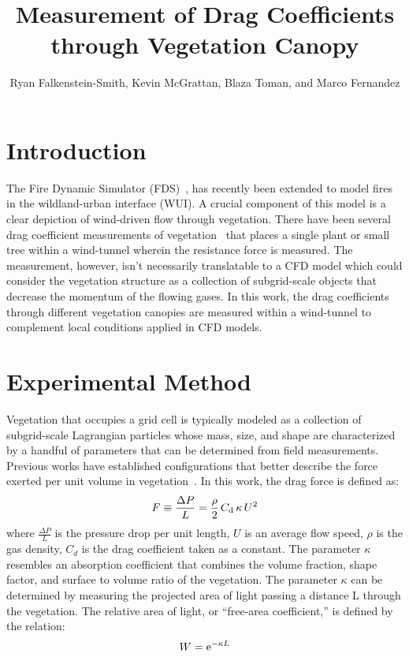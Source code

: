 \documentclass[a4paper,11pt]{article}
\title{\vspace{-2.0cm}\textbf{Measurement of Drag Coefficients through Vegetation Canopy} }
\author{Ryan Falkenstein-Smith, Kevin McGrattan, Blaza Toman, and Marco Fernandez}
\affil{National Institute of Standards and Technology}
\date{\vspace{-5ex}}
\begin{document}
\maketitle
\thispagestyle{empty}

\section{Introduction}
The Fire Dynamic Simulator (FDS)~\cite{FDS_Tech_Guide}, has recently been extended to model fires in the wildland-urban interface (WUI). A crucial component of this model is a clear depiction of wind-driven flow through vegetation. There have been several drag coefficient measurements of vegetation~\cite{Cao2012,Jalonen2014,Mayhead1973} that places a single plant or small tree within a wind-tunnel wherein the resistance force is measured. The measurement, however, isn’t necessarily translatable to a CFD model which could consider the vegetation structure as a collection of subgrid-scale objects that decrease the momentum of the flowing gases. In this work, the drag coefficients through different vegetation canopies are measured within a wind-tunnel to complement local conditions applied in CFD models.

\section{Experimental Method}
Vegetation that occupies a grid cell is typically modeled as a collection of subgrid-scale Lagrangian particles whose mass, size, and shape are characterized by a handful of parameters that can be determined from field measurements. Previous works have established configurations that better describe the force exerted per unit volume in vegetation~\cite{Mueller2014}. In this work, the drag force is defined as:
\begin{equation}\label{eq:Pressure}
F \equiv \frac{\Delta P}{L}  = \frac{\rho}{2} \, C_{\rm d} \, \kappa \, U^2
\end{equation}
where $\frac{\Delta P}{L}$ is the pressure drop per unit length, $U$ is an average flow speed, $\rho$ is the gas density, $C_{d}$ is the drag coefficient taken as a constant. The parameter $\kappa$ resembles an absorption coefficient that combines the volume fraction, shape factor, and surface to volume ratio of the vegetation. The parameter $\kappa$ can be determined by measuring the projected area of light passing a distance L through the vegetation. The relative area of light, or “free-area coefficient,” is defined by the relation: 
\begin{equation}\label{eq:WhiteFraction}
W = {\rm e}^{-\kappa L}
\end{equation}
\end{document}
